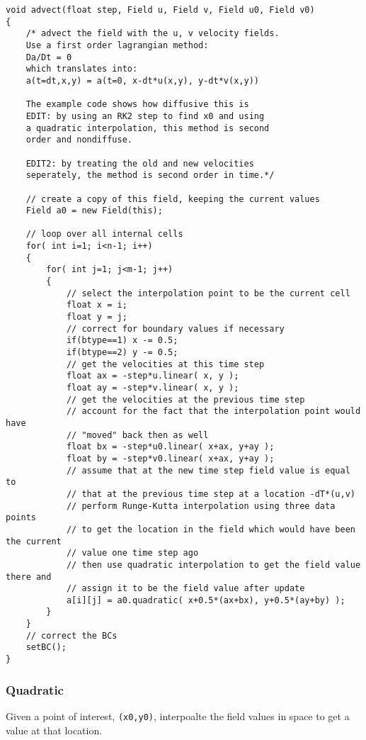 \documentclass[notitlepage]{article}
\begin{document}
\begin{lstlisting}[style=myCpp]
void advect(float step, Field u, Field v, Field u0, Field v0)
{
	/* advect the field with the u, v velocity fields.
	Use a first order lagrangian method:
	Da/Dt = 0
	which translates into:
	a(t=dt,x,y) = a(t=0, x-dt*u(x,y), y-dt*v(x,y))
	
	The example code shows how diffusive this is 
	EDIT: by using an RK2 step to find x0 and using
	a quadratic interpolation, this method is second
	order and nondiffuse.
	
	EDIT2: by treating the old and new velocities 
	seperately, the method is second order in time.*/
	
	// create a copy of this field, keeping the current values
	Field a0 = new Field(this);
	
	// loop over all internal cells
	for( int i=1; i<n-1; i++)
	{
		for( int j=1; j<m-1; j++)
		{
			// select the interpolation point to be the current cell
			float x = i;
			float y = j;
			// correct for boundary values if necessary
			if(btype==1) x -= 0.5;
			if(btype==2) y -= 0.5;
			// get the velocities at this time step
			float ax = -step*u.linear( x, y );
			float ay = -step*v.linear( x, y );
			// get the velocities at the previous time step
			// account for the fact that the interpolation point would have
			// "moved" back then as well
			float bx = -step*u0.linear( x+ax, y+ay );
			float by = -step*v0.linear( x+ax, y+ay );
			// assume that at the new time step field value is equal to
			// that at the previous time step at a location -dT*(u,v)
			// perform Runge-Kutta interpolation using three data points
			// to get the location in the field which would have been the current
			// value one time step ago
			// then use quadratic interpolation to get the field value there and
			// assign it to be the field value after update
			a[i][j] = a0.quadratic( x+0.5*(ax+bx), y+0.5*(ay+by) );
		}
	}
	// correct the BCs
	setBC();
}
\end{lstlisting}

\subsubsection{Quadratic}

Given a point of interest, \texttt{(x0,y0)}, interpoalte the field values in space to
get a value at that location.
\end{document}
